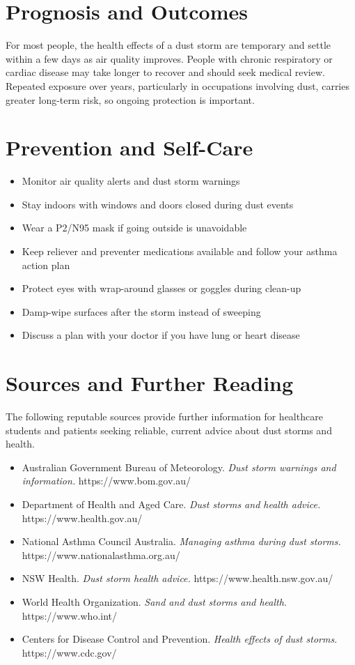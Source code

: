 \section*{Prognosis and Outcomes}
For most people, the health effects of a dust storm are temporary and settle within a few days as air quality improves. People with chronic respiratory or cardiac disease may take longer to recover and should seek medical review. Repeated exposure over years, particularly in occupations involving dust, carries greater long-term risk, so ongoing protection is important.

\section*{Prevention and Self-Care}
\begin{itemize}
    \item Monitor air quality alerts and dust storm warnings
    \item Stay indoors with windows and doors closed during dust events
    \item Wear a P2/N95 mask if going outside is unavoidable
    \item Keep reliever and preventer medications available and follow your asthma action plan
    \item Protect eyes with wrap-around glasses or goggles during clean-up
    \item Damp-wipe surfaces after the storm instead of sweeping
    \item Discuss a plan with your doctor if you have lung or heart disease
\end{itemize}

\section*{Sources and Further Reading}
The following reputable sources provide further information for healthcare students and patients seeking reliable, current advice about dust storms and health.
\begin{itemize}
    \item Australian Government Bureau of Meteorology. \textit{Dust storm warnings and information.} https://www.bom.gov.au/
    \item Department of Health and Aged Care. \textit{Dust storms and health advice.} https://www.health.gov.au/
    \item National Asthma Council Australia. \textit{Managing asthma during dust storms.} https://www.nationalasthma.org.au/
    \item NSW Health. \textit{Dust storm health advice.} https://www.health.nsw.gov.au/
    \item World Health Organization. \textit{Sand and dust storms and health.} https://www.who.int/
    \item Centers for Disease Control and Prevention. \textit{Health effects of dust storms.} https://www.cdc.gov/
\end{itemize}
